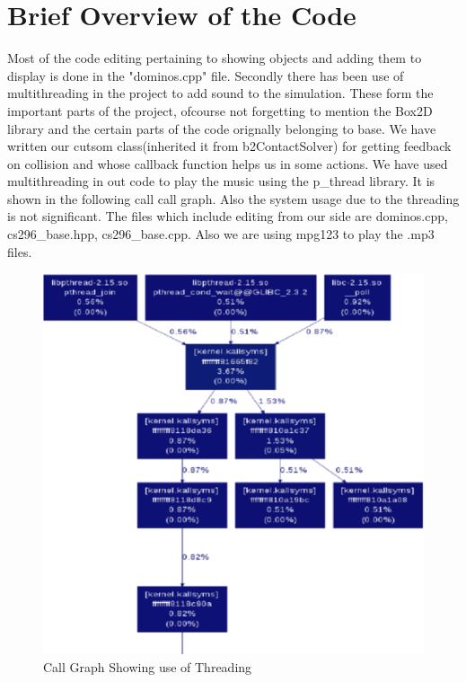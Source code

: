 \documentclass[a4paper,11pt]{article}
\begin{document}
\section{Brief Overview of the Code}
	Most of the code editing pertaining to showing objects and adding them to display is done in the "dominos.cpp" file. Secondly there has been use of multithreading in the project to add sound to the simulation. These form the important parts of the project, ofcourse not forgetting to mention the Box2D library and the certain parts of the code orignally belonging to base.
	We have written our cutsom class(inherited it from b2ContactSolver) for getting feedback on collision and whose callback function helps us in some actions. 
	We have used multithreading in out code to play the music using the p\_thread library. It is shown in the following call call graph. Also the system usage due to the threading is not significant.
	The files which include editing from our side are dominos.cpp, cs296\_base.hpp, cs296\_base.cpp. Also we are using mpg123 to play the .mp3 files.

	\begin{figure}[ht]
			\begin{center}
		\includegraphics[width=115mm]{images/threading.eps}
		\caption{Call Graph Showing use of Threading }	
		\label{fig:Threading}
		\end{center}
	\end{figure}

\pagebreak
\end{document}
